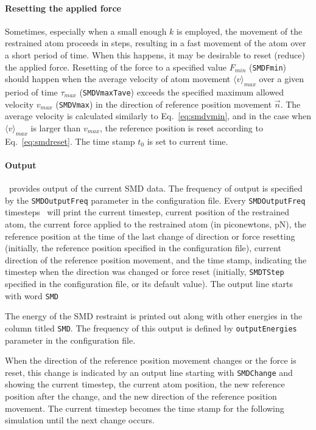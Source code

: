 \paragraph*{Resetting the applied force}

Sometimes, especially when a small enough $k$ is employed, the
movement of the restrained atom proceeds in steps, resulting in a fast
movement of the atom over a short period of time. When this happens,
it may be desirable to reset (reduce) the applied force. Resetting of
the force to a specified value $F_{min}$ ({\tt SMDFmin}) should happen
when the average velocity of atom movement $\langle v\rangle_{max}$
over a given period of time $\tau_{max}$ ({\tt SMDVmaxTave}) exceeds
the specified maximum allowed velocity $v_{max}$ ({\tt SMDVmax}) in
the direction of reference position movement $\vec n$. The average
velocity is calculated similarly to Eq.~\ref{eq:smdvmin}, and in the
case when $\langle v\rangle_{max}$ is larger than $v_{max}$, the
reference position is reset according to Eq.~\ref{eq:smdreset}. The
time stamp $t_0$ is set to current time.


\paragraph*{Output}

\NAMD\ provides output of the current SMD data. The frequency of
output is specified by the \verb!SMDOutputFreq! parameter in the
configuration file. Every \verb!SMDOutputFreq! timesteps \NAMD\ will
print the current timestep, current position of the restrained atom,
the current force applied to the restrained atom (in piconewtons, pN),
the reference position at the time of the last change of
direction or force resetting (initially, the reference position
specified in the configuration file), current direction of the
reference position movement, and the time stamp, indicating the
timestep when the direction was changed or force reset (initially, 
\verb!SMDTStep! specified in the configuration file, or its default
value). The output line starts with word {\tt SMD}

The energy of the SMD restraint is printed out along with other
energies in the column titled {\tt SMD}. The frequency of this output
is defined by \verb!outputEnergies! parameter in the configuration
file. 

When the direction of the reference position movement changes or the
force is reset, this change is indicated by an output line starting
with {\tt SMDChange} and showing the current timestep, the current
atom position, the new reference position after the change, and the
new direction of the reference position movement. The current timestep
becomes the time stamp for the following simulation until the next
change occurs.



